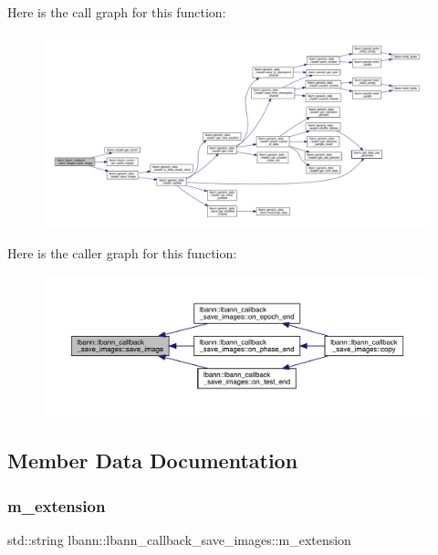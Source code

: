 Here is the call graph for this function\+:\nopagebreak
\begin{figure}[H]
\begin{center}
\leavevmode
\includegraphics[width=350pt]{classlbann_1_1lbann__callback__save__images_ab84c4d511a4614ca90644d12dc77edee_cgraph}
\end{center}
\end{figure}
Here is the caller graph for this function\+:\nopagebreak
\begin{figure}[H]
\begin{center}
\leavevmode
\includegraphics[width=350pt]{classlbann_1_1lbann__callback__save__images_ab84c4d511a4614ca90644d12dc77edee_icgraph}
\end{center}
\end{figure}


\subsection{Member Data Documentation}
\mbox{\label{classlbann_1_1lbann__callback__save__images_a7b37fa08f49051897ef427b8c810ca3a}} 
\subsubsection{\texorpdfstring{m\+\_\+extension}{m\_extension}}
{\footnotesize\ttfamily std\+::string lbann\+::lbann\+\_\+callback\+\_\+save\+\_\+images\+::m\+\_\+extension\hspace{0.3cm}{\ttfamily [private]}}



